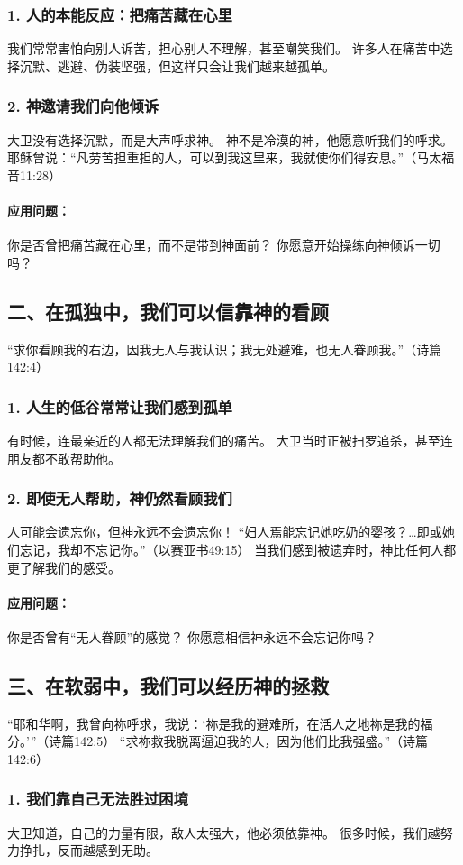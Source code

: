 \documentclass[a4paper, 12pt]{article}
\begin{document}
\subsubsection*{1. 人的本能反应：把痛苦藏在心里}
我们常常害怕向别人诉苦，担心别人不理解，甚至嘲笑我们。
许多人在痛苦中选择沉默、逃避、伪装坚强，但这样只会让我们越来越孤单。
\subsubsection*{2. 神邀请我们向他倾诉}
大卫没有选择沉默，而是大声呼求神。
神不是冷漠的神，他愿意听我们的呼求。
耶稣曾说：“凡劳苦担重担的人，可以到我这里来，我就使你们得安息。”（马太福音11:28）
\paragraph*{应用问题：}
你是否曾把痛苦藏在心里，而不是带到神面前？
你愿意开始操练向神倾诉一切吗？
\subsection*{二、在孤独中，我们可以信靠神的看顾}
“求你看顾我的右边，因我无人与我认识；我无处避难，也无人眷顾我。”（诗篇142:4）

\subsubsection*{1. 人生的低谷常常让我们感到孤单}
有时候，连最亲近的人都无法理解我们的痛苦。
大卫当时正被扫罗追杀，甚至连朋友都不敢帮助他。
\subsubsection*{2. 即使无人帮助，神仍然看顾我们}
人可能会遗忘你，但神永远不会遗忘你！
“妇人焉能忘记她吃奶的婴孩？…即或她们忘记，我却不忘记你。”（以赛亚书49:15）
当我们感到被遗弃时，神比任何人都更了解我们的感受。
\paragraph*{应用问题：}
你是否曾有“无人眷顾”的感觉？
你愿意相信神永远不会忘记你吗？
\subsection*{三、在软弱中，我们可以经历神的拯救}
“耶和华啊，我曾向祢呼求，我说：‘祢是我的避难所，在活人之地祢是我的福分。’”（诗篇142:5）
“求祢救我脱离逼迫我的人，因为他们比我强盛。”（诗篇142:6）

\subsubsection*{1. 我们靠自己无法胜过困境}
大卫知道，自己的力量有限，敌人太强大，他必须依靠神。
很多时候，我们越努力挣扎，反而越感到无助。
\end{document}
